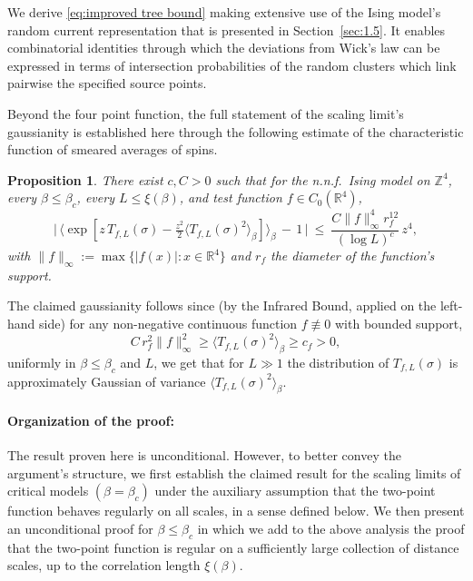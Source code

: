 \documentclass[a4paper,oneside,11pt]{article}
\def\Z{\mathbb{Z}}                          %
\def\R{\mathbb{R}}
\newtheorem{proposition}[theorem]{Proposition}
\newcommand{\be}[1]{\begin{equation}\label{#1}}
\newcommand{\ee}{\end{equation}}
\numberwithin{equation}{section}
\numberwithin{equation}{section}
\numberwithin{equation}{section}
\def\Z{\mathbb{Z}}                          %
\def\be{\begin{equation}}
\def\ee{\end{equation}}
\begin{document}
 
We derive \eqref{eq:improved tree bound} making extensive use of  the Ising model's random current representation that is presented in Section~\ref{sec:1.5}.  It enables combinatorial identities 
through which the   
deviations from Wick's law can be expressed in terms of intersection probabilities of the random clusters which link pairwise the specified source points.  

Beyond the four point function, the full statement of the scaling limit's gaussianity  is established here through the following estimate of the characteristic function of smeared averages of spins. 

\begin{proposition}\label{prop:gaussian b}
There exist $c,C>0$ such that for the n.n.f.~Ising model on $\Z^4$, every $\beta\le\beta_c$, every $L\le\xi(\beta)$, and  test function $f \in C_0(\R^4)$,  
\be \label{eq:gauss}
 \Big|\,\big\langle \exp[z\,T_{f,L}(\sigma)-\tfrac{z^2}2\langle T_{f,L}(\sigma)^2\rangle_\beta ]\big\rangle_\beta\,-\,1\,\Big|~\le~ \frac{C\|f\|_\infty^4r_f^{12}}{(\log L)^c}\,z^4,
\ee
with $\| f\|_\infty := \max\{|f(x)|:x\in \R^4\}$ and $r_f$ the diameter of the function's support. 
\end{proposition}

The claimed gaussianity follows since  (by the Infrared Bound, applied on the left-hand side) for any non-negative continuous function $f \nequiv 0$ with bounded support,
\be
C\,r_f^2 \| f\|^2_\infty   
 \geq  \langle T_{f,L}(\sigma)^2\rangle_\beta  \ge  c_f>0,
\ee 
uniformly in $\beta\le\beta_c$ and $L$, 
 we get that  for $L\gg 1$ the distribution of 
$T_{f,L}(\sigma)$ is approximately   Gaussian  of variance $\langle T_{f,L}(\sigma)^2\rangle_\beta$.


 \paragraph{Organization of the proof:}
 The result proven here is unconditional.   However, to better convey the argument's structure, we  first establish the claimed result for the scaling limits of critical models $(\beta=\beta_c)$  under the auxiliary assumption that the two-point function behaves regularly on all scales, in  a sense defined below.  We then present an unconditional proof for $\beta\le\beta_c$ in which we add to the above analysis the proof that the two-point function is regular on a sufficiently large collection of distance scales, up to the correlation length $\xi(\beta)$.   
 
\end{document}
